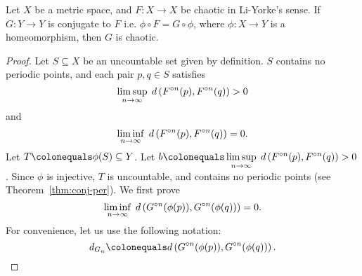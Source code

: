 \documentclass[12pt,draft,twoside]{book}
\begin{document}
\begin{theorem}
  Let $X$ be a metric space, and $F: X\to X$ be chaotic in Li-Yorke's sense.
  If $G: Y\to Y$ is conjugate to $F$ i.e. $\phi \circ F = G \circ \phi$, where $\phi: X \to Y$ is a homeomorphism, then $G$ is chaotic.
  \begin{proof}
    Let $S \subseteq X$ be an uncountable set given by definition.
    $S$ contains no periodic points, and each pair $p,q \in S$ satisfies
    \begin{equation*}
      \limsup\limits_{n \to \infty}\; d\left( F^{\circ n}(p) , F^{\circ n}(q) \right) > 0
    \end{equation*}
    and
    \begin{equation*}
      \liminf\limits_{n \to \infty}\; d\left( F^{\circ n}(p) , F^{\circ n}(q) \right) = 0.
    \end{equation*}
    Let $T \ceq \phi(S) \subseteq Y$.
    Let $b \ceq \limsup\limits_{n \to \infty}\; \metric{\itr{F}{n}(p) , \itr{F}{n}(q)} > 0$.
    Since $\phi$ is injective, $T$ is uncountable, and contains no periodic points (see Theorem~\ref{thm:conj-per}).
    We first prove
    \begin{equation*}
      \liminf\limits_{n \to \infty}\; d\left( G^{\circ n}(\phi(p)) , G^{\circ n}(\phi(q)) \right) = 0.
    \end{equation*}
    For convenience, let us use the following notation:
    \begin{equation*}
      d_{G_n} \ceq \metric{\itr{G}{n}(\phi(p)) , \itr{G}{n}(\phi(q))}.
    \end{equation*}


\end{proof}
\end{theorem}
\end{document}
